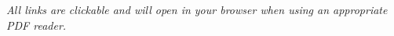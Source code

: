 \documentclass[12pt,a4paper]{report}
\begin{document}
\vspace{1cm}
\noindent
\textit{All links are clickable and will open in your browser when using an appropriate PDF reader.}

\newpage
\tableofcontents

\newpage


\newpage


\newpage


\newpage


\newpage


\newpage

\end{document}
